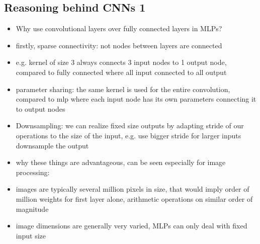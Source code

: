 \documentclass{article}
\begin{document}
\subsection*{Reasoning behind CNNs 1}
\begin{itemize}
    \item Why use convolutional layers over fully connected layers in MLPs?
    \item firstly, sparse connectivity: not nodes between layers are connected
    \item e.g. kernel of size 3 always connects 3 input nodes to 1 output node, compared to fully connected where all input connected to all output
    \item parameter sharing: the same kernel is used for the entire convolution, compared to mlp where each input node has its own parameters connecting it to output nodes 
    \item Downsampling: we can realize fixed size outputs by adapting stride of our operations to the size of the input, e.g. use bigger stride for larger inputs downsample the output
    \item why these things are advantageous, can be seen especially for image processing:
    \item images are typically several million pixels in size, that would imply order of million weights for first layer alone, arithmetic operations on similar order of magnitude
    \item image dimensions are generally very varied, MLPs can only deal with fixed input size
\end{itemize}
\end{document}
